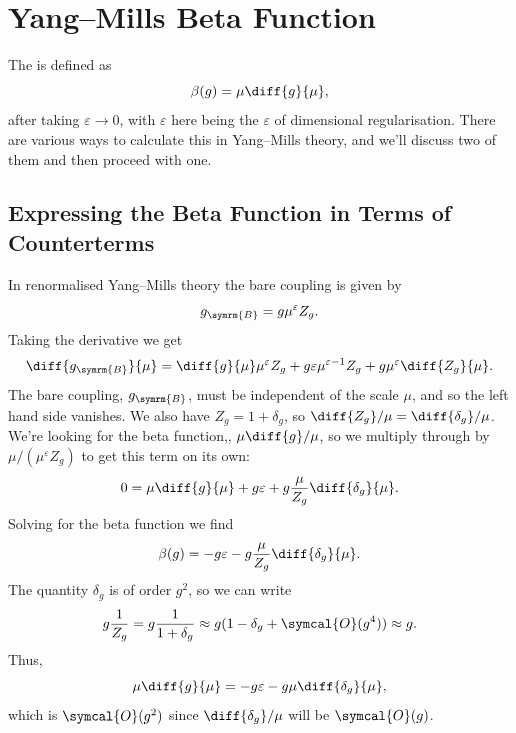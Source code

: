 \documentclass[fleqn]{NotesClass}
\newcommand{\bare}{\symrm{B}}
\newcommand{\order}{\symcal{O}}
\begin{document}
    \chapter{Yang--Mills Beta Function}
    The  is defined as
    \begin{equation}
        \beta(g) = \mu \diff{g}{\mu},
    \end{equation}
    after taking \(\varepsilon \to 0\), with \(\varepsilon\) here being the \(\varepsilon\) of dimensional regularisation.
    There are various ways to calculate this in Yang--Mills theory, and we'll discuss two of them and then proceed with one.
    
    \section{Expressing the Beta Function in Terms of Counterterms}
    In renormalised Yang--Mills theory the bare coupling is given by
    \begin{equation}
        g_{\bare} = g\mu^{\varepsilon}Z_g.
    \end{equation}
    Taking the derivative we get
    \begin{equation}
        \diff{g_{\bare}}{\mu} = \diff{g}{\mu} \mu^{\varepsilon} Z_g + g \varepsilon \mu^{\varepsilon - 1} Z_g + g \mu^{\varepsilon} \diff{Z_g}{\mu}.
    \end{equation}
    The bare coupling, \(g_{\bare}\), must be independent of the scale \(\mu\), and so the left hand side vanishes.
    We also have \(Z_g = 1 + \delta_g\), so \(\diff{Z_g}/{\mu} = \diff{\delta_g}/{\mu}\).
    We're looking for the beta function,, \(\mu \diff{g}/{\mu}\), so we multiply through by \(\mu/(\mu^{\varepsilon} Z_g)\) to get this term on its own:
    \begin{equation}
        0 = \mu\diff{g}{\mu} + g \varepsilon + g \frac{\mu}{Z_g} \diff{\delta_g}{\mu}.
    \end{equation}
    Solving for the beta function we find
    \begin{equation}
        \beta(g) = -g\varepsilon - g\frac{\mu}{Z_g} \diff{\delta_g}{\mu}.
    \end{equation}
    The quantity \(\delta_g\) is of order \(g^2\), so we can write
    \begin{equation}
        g\frac{1}{Z_g} = g\frac{1}{1 + \delta_g} \approx g(1 - \delta_g + \order(g^4)) \approx g.
    \end{equation}
    Thus,
    \begin{equation}
        \mu \diff{g}{\mu} = -g\varepsilon - g\mu\diff{\delta_g}{\mu},
    \end{equation}
    which is \(\order(g^2)\) since \(\diff{\delta_g}/{\mu}\) will be \(\order(g)\).
    
\end{document}
